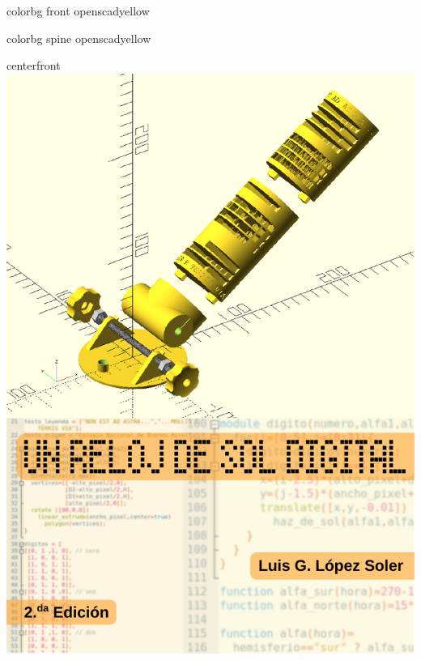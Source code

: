\documentclass[coverheight=210mm,coverwidth=148.5mm, bleedwidth=23mm,
spinewidth=23mm, foldingmargin, marklength=4mm, 11pt]{bookcover}
\begin{document}
\begin{bookcover}

   \begin{bookcoverelement}{color}{bg front}
     openscadyellow
   \end{bookcoverelement}
   \begin{bookcoverelement}{color}{bg spine}
     openscadyellow
   \end{bookcoverelement}


    \begin{bookcoverelement}{center}{front}
     \includegraphics{tapa-A5.pdf}
   \end{bookcoverelement}


\end{bookcover}
\end{document}
